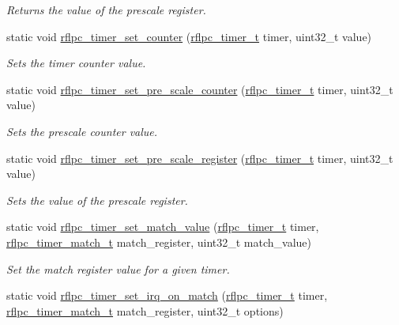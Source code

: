 \begin{DoxyCompactItemize}
\begin{DoxyCompactList}\small\item\em Returns the value of the prescale register. \end{DoxyCompactList}\item 
static void \hyperlink{group__timer_ga3000e271844c8368b00d2ad920c046df}{rflpc\-\_\-timer\-\_\-set\-\_\-counter} (\hyperlink{group__timer_gac08825cb88d61086e74638b859cb8b34}{rflpc\-\_\-timer\-\_\-t} timer, uint32\-\_\-t value)
\begin{DoxyCompactList}\small\item\em Sets the timer counter value. \end{DoxyCompactList}\item 
static void \hyperlink{group__timer_ga111ed4c30cbaadadcff06a3f199e8e80}{rflpc\-\_\-timer\-\_\-set\-\_\-pre\-\_\-scale\-\_\-counter} (\hyperlink{group__timer_gac08825cb88d61086e74638b859cb8b34}{rflpc\-\_\-timer\-\_\-t} timer, uint32\-\_\-t value)
\begin{DoxyCompactList}\small\item\em Sets the prescale counter value. \end{DoxyCompactList}\item 
static void \hyperlink{group__timer_gacbcb64481ba2834f37c46629823a6b7e}{rflpc\-\_\-timer\-\_\-set\-\_\-pre\-\_\-scale\-\_\-register} (\hyperlink{group__timer_gac08825cb88d61086e74638b859cb8b34}{rflpc\-\_\-timer\-\_\-t} timer, uint32\-\_\-t value)
\begin{DoxyCompactList}\small\item\em Sets the value of the prescale register. \end{DoxyCompactList}\item 
static void \hyperlink{group__timer_gaf6d00c931d46b50694fcba4eb88311b6}{rflpc\-\_\-timer\-\_\-set\-\_\-match\-\_\-value} (\hyperlink{group__timer_gac08825cb88d61086e74638b859cb8b34}{rflpc\-\_\-timer\-\_\-t} timer, \hyperlink{group__timer_ga6be569cd5e74a2e35678ee2de31e853a}{rflpc\-\_\-timer\-\_\-match\-\_\-t} match\-\_\-register, uint32\-\_\-t match\-\_\-value)
\begin{DoxyCompactList}\small\item\em Set the match register value for a given timer. \end{DoxyCompactList}\item 
static void \hyperlink{group__timer_gabce7312683163541ea46422b83dd5279}{rflpc\-\_\-timer\-\_\-set\-\_\-irq\-\_\-on\-\_\-match} (\hyperlink{group__timer_gac08825cb88d61086e74638b859cb8b34}{rflpc\-\_\-timer\-\_\-t} timer, \hyperlink{group__timer_ga6be569cd5e74a2e35678ee2de31e853a}{rflpc\-\_\-timer\-\_\-match\-\_\-t} match\-\_\-register, uint32\-\_\-t options)

\end{DoxyCompactItemize}
